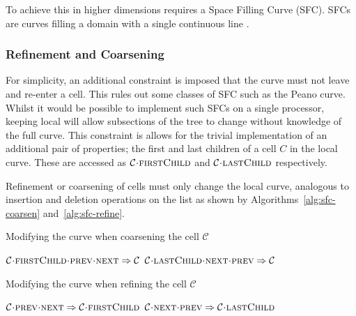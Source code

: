 \documentclass[twoside]{IIBproject}
\newcommand{\acc}{{\mkern 0.5mu\cdot\mkern 0.5mu}}
\numberwithin{figure}{section}
\begin{document}
        To achieve this in higher dimensions requires a Space Filling Curve (SFC). SFCs are curves filling a domain with a single continuous line \cite{bader2013}. 


        \subsubsection{Refinement and Coarsening} %
            \label{sec:tftt-refine}

            For simplicity, an additional constraint is imposed that the curve must not leave and re-enter a cell. This rules out some classes of SFC such as the Peano curve. Whilst it would be possible to implement such SFCs on a single processor, keeping local will allow subsections of the tree to change without knowledge of the full curve. This constraint is allows for the trivial implementation of  an additional pair of properties; the first and last children of a cell $C$ in the local curve. These are accessed as $\mathcal{C}\acc\textproc{firstChild}$ and $\mathcal{C}\acc\textproc{lastChild}$ respectively.

            Refinement or coarsening of cells must only change the local curve, analogous to insertion and deletion operations on the list as shown by Algorithms~\ref{alg:sfc-coarsen} and~\ref{alg:sfc-refine}.

            \begin{algorithm}[H]
                \caption{Modifying the curve when coarsening the cell $\mathcal{C}$}
                \label{alg:sfc-coarsen}

                \begin{algorithmic}
                    \State $\mathcal{C}\acc\textproc{firstChild}\acc\textproc{prev}\acc\textproc{next} \Rightarrow \mathcal{C}$
                    \State $\mathcal{C}\acc\textproc{lastChild}\acc\textproc{next}\acc\textproc{prev} \Rightarrow \mathcal{C}$
                \end{algorithmic}
            \end{algorithm}

            \begin{algorithm}[H]
                \caption{Modifying the curve when refining the cell $\mathcal{C}$}
                \label{alg:sfc-refine}

                \begin{algorithmic}
                    \Statex
                    \State $\mathcal{C}\acc\textproc{prev}\acc\textproc{next} \Rightarrow \mathcal{C}\acc\textproc{firstChild}$
                    \State $\mathcal{C}\acc\textproc{next}\acc\textproc{prev} \Rightarrow \mathcal{C}\acc\textproc{lastChild}$
                \end{algorithmic}
            \end{algorithm}
\end{document}
